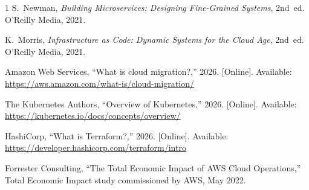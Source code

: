 \documentclass[conference]{IEEEtran}
\begin{document}
\begin{thebibliography}{1}
S.~Newman, \emph{Building Microservices: Designing Fine-Grained Systems},
2nd~ed. O'Reilly Media, 2021.

K.~Morris, \emph{Infrastructure as Code: Dynamic Systems for the Cloud Age},
2nd~ed. O'Reilly Media, 2021.

Amazon Web Services, ``What is cloud migration?,'' 2026. [Online].
Available: \url{https://aws.amazon.com/what-is/cloud-migration/}

The Kubernetes Authors, ``Overview of Kubernetes,'' 2026. [Online].
Available: \url{https://kubernetes.io/docs/concepts/overview/}

HashiCorp, ``What is Terraform?,'' 2026. [Online]. Available:
\url{https://developer.hashicorp.com/terraform/intro}

Forrester Consulting, ``The Total Economic Impact of AWS Cloud Operations,''
Total Economic Impact study commissioned by AWS, May 2022.
\end{thebibliography}
\end{document}
